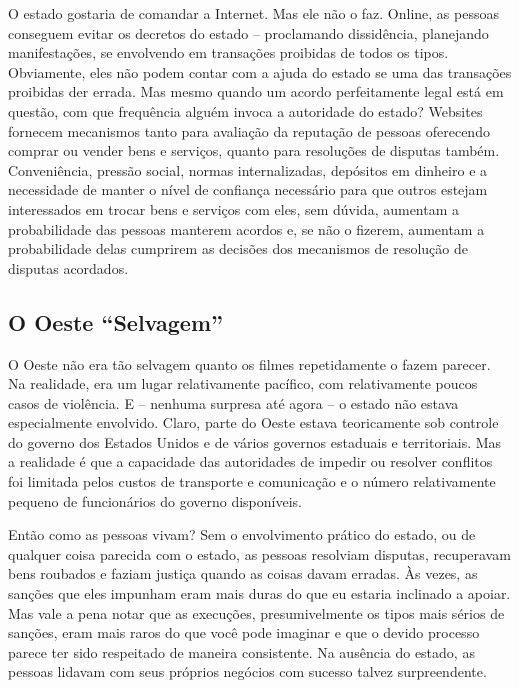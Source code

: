 O estado gostaria de comandar a Internet. Mas ele não o faz. Online, as pessoas conseguem evitar os decretos do estado -- proclamando dissidência, planejando manifestações, se envolvendo em transações proibidas de todos os tipos. Obviamente, eles não podem contar com a ajuda do estado se uma das transações proibidas der errada. Mas mesmo quando um acordo perfeitamente legal está em questão, com que frequência alguém invoca a autoridade do estado? Websites fornecem mecanismos tanto para avaliação da reputação de pessoas oferecendo comprar ou vender bens e serviços, quanto para resoluções de disputas também. Conveniência, pressão social, normas internalizadas, depósitos em dinheiro e a necessidade de manter o nível de confiança necessário para que outros estejam interessados em trocar bens e serviços com eles, sem dúvida, aumentam a probabilidade das pessoas manterem acordos e, se não o fizerem, aumentam a probabilidade delas cumprirem as decisões dos mecanismos de resolução de disputas acordados.

\subsection*{O Oeste ``Selvagem'' }

O Oeste não era tão selvagem quanto os filmes repetidamente o fazem parecer. Na realidade, era um lugar relativamente pacífico, com relativamente poucos casos de violência. E -- nenhuma surpresa até agora -- o estado não estava especialmente envolvido. Claro, parte do Oeste estava teoricamente sob controle do governo dos Estados Unidos e de vários governos estaduais e territoriais. Mas a realidade é que a capacidade das autoridades de impedir ou resolver conflitos foi limitada pelos custos de transporte e comunicação e o número relativamente pequeno de funcionários do governo disponíveis.

Então como as pessoas vivam? Sem o envolvimento prático do estado, ou de qualquer coisa parecida com o estado, as pessoas resolviam disputas, recuperavam bens roubados e faziam justiça quando as coisas davam erradas. Às vezes, as sanções que eles impunham eram mais duras do que eu estaria inclinado a apoiar. Mas vale a pena notar que as execuções, presumivelmente os tipos mais sérios de sanções, eram mais raros do que você pode imaginar e que o devido processo parece ter sido respeitado de maneira consistente. Na ausência do estado, as pessoas lidavam com seus próprios negócios com sucesso talvez surpreendente.

